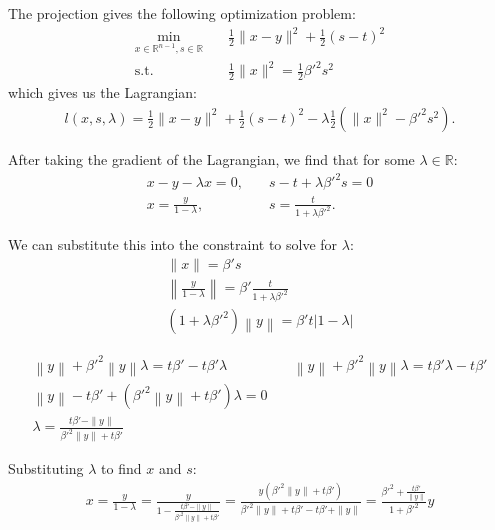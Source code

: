 \documentclass{article}
\theoremstyle{case}
\numberwithin{theorem}{subsection}
\newcommand{\reals}{\mathbb R}
\begin{document}
The projection gives the following optimization problem:
\begin{align*}
\min_{x \in \mathbb R^{n-1}, s \in \mathbb R} & \quad \frac 1 2 \|x - y\|^2 + \frac 1 2 (s - t)^2 \\
	\textrm{s.t.}		& \quad \frac 1 2 \|x\|^2 = \frac 1 2 {\beta'}^2 s^2
\end{align*}
which gives us the Lagrangian:
\begin{align*}
l(x, s, \lambda) = \frac 1 2 \|x - y \|^2 + \frac 1 2 \left(s - t\right)^2 - \lambda \frac 1 2 \left(\|x\|^2 - {\beta'}^2 s^2\right).
\end{align*}

After taking the gradient of the Lagrangian, we find that for some $\lambda \in \reals$:
\begin{align*}
x - y - \lambda x = 0, & \quad s - t + \lambda {\beta'}^2 s = 0 \\
x = \frac {y}{1 - \lambda}, & \quad s = \frac {t}{1 + \lambda {\beta'}^2 }.
\end{align*}

We can substitute this into the constraint to solve for $\lambda$:
\begin{align*}
\|x\| = {\beta'} s \\
\left\|\frac {y}{1 - \lambda}\right\| = {\beta'} \frac {t}{1 + \lambda {\beta'}^2 } \\
\left(1 + \lambda {\beta'}^2\right) \left\|y\right\| = {\beta'}  {t} \left|1 - \lambda\right|
\end{align*}

\begin{align*}
\left\|y\right\| + {\beta'}^2\left\|y\right\|\lambda = t {\beta'} - t {\beta'} \lambda          &   \quad
\left\|y\right\| + {\beta'}^2\left\|y\right\|\lambda = t {\beta'} \lambda - t {\beta'}					\\
\left\|y\right\|-t {\beta'} +\left( {\beta'}^2\left\|y\right\| + t {\beta'} \right)\lambda = 0  &		\\
\lambda = \frac{t {\beta'} - \|y\|}{{\beta'}^2\|y\| + t {\beta'}}                               &		
\end{align*}


Substituting $\lambda$ to find $x$ and $s$:
\begin{align*}
x = \frac {y}{1 - \lambda} 																		
= \frac {y}{1 - \frac{t{\beta'} - \|y\|}{{\beta'}^2\|y\| + t{\beta'}}} 									
= \frac {y\left({\beta'}^2\|y\| + t{\beta'}\right)}{{\beta'}^2\|y\| + t{\beta'} - t{\beta'} + \|y\|} 			
= \frac {{\beta'}^2 + \frac{t{\beta'}}{\|y\|}}{1 + {\beta'}^2}y 											
\end{align*}
\end{document}
